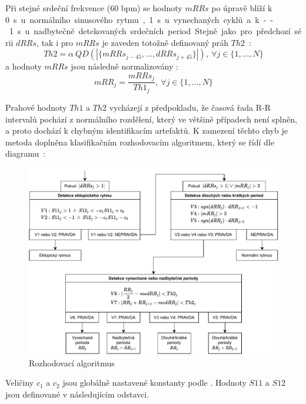 Při stejné srdeční frekvence (60 bpm) se hodnoty $mRRs$ po úpravě blíží k
0~\si\s~u normálního sinusového rytmu, 1~\si\s~ u vynechaných cyklů a k
--1~\si\s~ u nadbytečně detekovaných srdečních period. Stejně jako pro předchozí
sérii $dRRs$, tak i pro $mRRs$ je zaveden totožně definovaný práh
$Th2$~\cite{Lipponen2019}:
\begin{equation}
    Th2 = \alpha~QD(|\{mRRs_{j-45},...,dRRs_{j+45}\}|), ~\forall j \in \{1,...,N\}
\end{equation}
a hodnoty $mRRs$ jsou následně normalizovány \cite{Lipponen2019}:
\begin{equation}
    mRR_j = \frac{mRRs_j}{Th1_j}, ~\forall j \in \{1,...,N\}
\end{equation}

Prahové hodnoty $Th1$ a $Th2$ vycházejí z předpokladu, že časová řada R-R
intervalů pochází z normálního rozdělení, který ve většině případech není
splněn, a proto dochází k chybným identifikacím artefaktů. K zamezení těchto
chyb je metoda doplněna klasifikačním rozhodovacím algoritmem, který se řídí dle
diagramu~\cite{Lipponen2019}:

\begin{figure}[h]
    \begin{center}
        \includegraphics[width=1\textwidth]{../assets/diagrams/rr_decision}
        \caption{Rozhodovací algoritmus \cite{Lipponen2019}}
        \label{fig:rr_decision}
    \end{center}
\end{figure}

Veličiny $c_1$ a $c_2$ jsou globálně nastavené konstanty podle
\cite{Lipponen2019}. Hodnoty $S11$ a $S12$ jsou definované v následujícím
odstavci.

